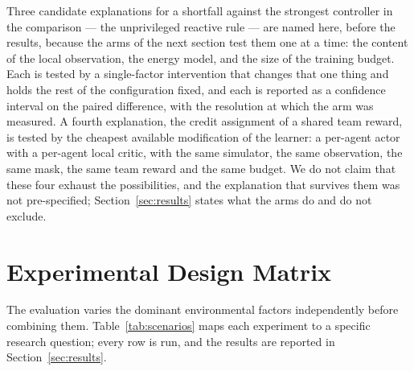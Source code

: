 \documentclass[conference]{IEEEtran}
\begin{document}
Three candidate explanations for a shortfall against the strongest controller in the comparison --- the unprivileged reactive rule --- are named here, before the results, because the arms of the next section test them one at a time: the content of the local observation, the energy model, and the size of the training budget. Each is tested by a single-factor intervention that changes that one thing and holds the rest of the configuration fixed, and each is reported as a confidence interval on the paired difference, with the resolution at which the arm was measured. A fourth explanation, the credit assignment of a shared team reward, is tested by the cheapest available modification of the learner: a per-agent actor with a per-agent local critic, with the same simulator, the same observation, the same mask, the same team reward and the same budget. We do not claim that these four exhaust the possibilities, and the explanation that survives them was not pre-specified; Section~\ref{sec:results} states what the arms do and do not exclude.


\section{Experimental Design Matrix}
\label{sec:experimentaldesign}
The evaluation varies the dominant environmental factors independently before combining them. Table~\ref{tab:scenarios} maps each experiment to a specific research question; every row is run, and the results are reported in Section~\ref{sec:results}.
\end{document}
